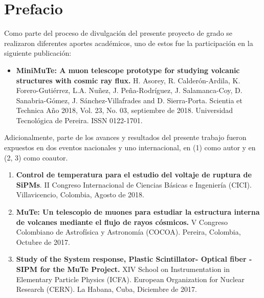 
\chapter*{Prefacio}
\label{Cap:Prefacio}
Como parte del proceso de divulgación del presente proyecto de grado se realizaron diferentes aportes académicos,  uno de estos fue la participación en la siguiente publicación:
\begin{itemize}
	\item \textbf{MiniMuTe: A muon telescope prototype for studying volcanic structures with cosmic ray flux.} H. Asorey, R. Calderón-Ardila, K. Forero-Gutiérrez, L.A. Nuñez, J. Peña-Rodríguez, J. Salamanca-Coy, D. Sanabria-Gómez, J. Sánchez-Villafrades and D. Sierra-Porta. Scientia  et Technica  Año 2018, Vol. 23, No. 03, septiembre  de 2018. Universidad  Tecnológica  de Pereira. ISSN 0122-1701.
\end{itemize} 
Adicionalmente, parte de los avances y resultados del presente trabajo fueron expuestos en dos eventos nacionales y uno internacional, en (1) como autor y en (2, 3) como coautor.
\begin{enumerate}
	\item \textbf{Control de temperatura para el estudio del voltaje de ruptura de SiPMs}. II Congreso Internacional de Ciencias Básicas e Ingeniería (CICI). Villavicencio, Colombia, Agosto de 2018.
	\item \textbf{MuTe: Un telescopio de muones para estudiar la estructura interna de volcanes mediante el flujo de rayos cósmicos.} V Congreso Colombiano de Astrofísica y Astronomía (COCOA). Pereira, Colombia, Octubre de 2017.
	\item \textbf{Study of the System response, Plastic Scintillator- Optical fiber - SIPM for the MuTe Project.} XIV School on Instrumentation in Elementary Particle Physics (ICFA). European Organization for Nuclear Research (CERN). La Habana, Cuba, Diciembre de 2017.
\end{enumerate}


